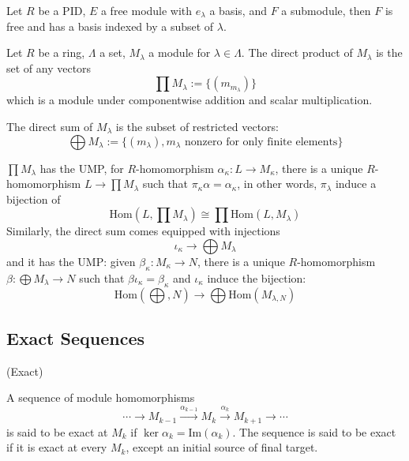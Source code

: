 \documentclass{article}
\begin{document}
\begin{theorem}
    Let $R$ be a PID, $E$ a free module with $e_{\lambda}$ a basis, and $F$ a submodule, then $F$ is free and has a basis indexed by a subset of $\lambda$.
\end{theorem}

\begin{definition}
    Let $R$ be a ring, $\Lambda$ a set, $M_{\lambda}$ a module for $\lambda\in\Lambda$. The direct product of $M_{\lambda}$ is the set of any vectors
    \[
    \prod M_{\lambda} := \{(m_{m_{\lambda}})\}
    \] 
    which is a module under componentwise addition and scalar multiplication.\par
    The direct sum of $M_{\lambda}$ is the subset of restricted vectors:
    \[
    \bigoplus M_{\lambda} := \{({m_{\lambda}}), m_{\lambda}\text{ nonzero for only finite elements}\}
    \]
\end{definition}

\begin{proposition}
    $\prod M_{\lambda}$ has the UMP,  for $R$-homomorphism $\alpha_{\kappa}:L\to M_{\kappa}$, there is a unique $R$-homomorphism $L\to \prod M_{\lambda}$ such that $\pi_{\kappa}\alpha = \alpha_{\kappa}$, in other words, $\pi_{\lambda}$ induce a bijection of
    \[\text{Hom}(L,\prod M_{\lambda}) \cong \prod \text{Hom}(L,M_{\lambda})\]
    Similarly, the direct sum comes equipped with injections
    \[\iota_{\kappa} \to \bigoplus M_{\lambda}\]
    and it has the UMP: given $\beta_{\kappa}:M_{\kappa} \to N$, there is a unique $R$-homomorphism $\beta:\bigoplus M_{\lambda} \to N$ such that $\beta \iota_{\kappa} = \beta_{\kappa}$ and $\iota_{\kappa}$ induce the bijection:
    \[\text{Hom}(\bigoplus, N) \to \bigoplus \text{Hom}(M_{\lambda, N})\]
\end{proposition}

\subsection{Exact Sequences}

\begin{definition}
    (Exact)\par
    A sequence of module homomorphisms
    \[
    \cdots \to M_{k-1}\overset{\alpha_{k-1}}{\to} M_k \overset{\alpha_k}{\to} M_{k+1} \to \cdots
    \]
    is said to be exact at $M_k$ if $\ker\alpha_k = \text{Im}(\alpha_k)$. The sequence is said to be exact if it is exact at every $M_k$, except an initial source of final target.
\end{definition}
\end{document}
